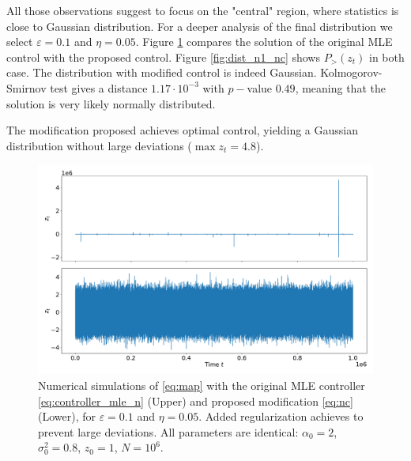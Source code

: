 \documentclass[FinalReport.tex]{subfiles}
\begin{document}
All those observations suggest to focus on the "central" region, where statistics is close to Gaussian distribution. For a deeper analysis of the final distribution we select $\varepsilon=0.1$ and $\eta=0.05$. Figure \ref{fig:ts_n1_nc} compares the solution of the original MLE control with the proposed control. Figure \ref{fig:dist_n1_nc} shows $P_>(z_t)$ in both case. The distribution with modified control is indeed Gaussian. Kolmogorov-Smirnov test gives a distance $1.17\cdot10^{-3}$ with $p-$value $0.49$, meaning that the solution is very likely normally distributed.


The modification proposed achieves optimal control, yielding a Gaussian distribution without large deviations ($\max{z_t}=4.8$).

\begin{figure}[h!]
\centering
	\centering
	\includegraphics[width=1\textwidth]{Graphs/ts_n1_nc}
	\caption{Numerical simulations of \eqref{eq:map} with the original MLE controller \eqref{eq:controller_mle_n} (Upper) and proposed modification \eqref{eq:nc} (Lower), for $\varepsilon=0.1$ and $\eta=0.05$. Added regularization achieves to prevent large deviations. All parameters are identical: $\alpha_0=2$, $\sigma_0^2=0.8$, $z_0=1$, $N=10^6$.}
	\label{fig:ts_n1_nc}	
\end{figure}
\end{document}
